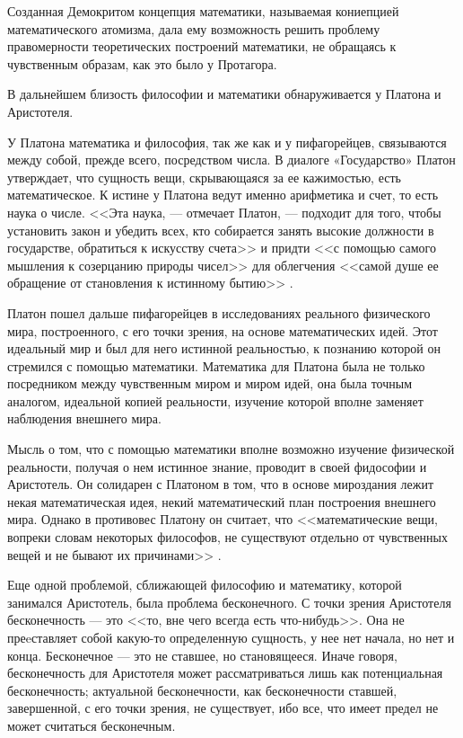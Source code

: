 \documentclass[a4page]{article}
\begin{document}
Созданная Демокритом концепция математики, называемая кониепцией математического атомизма,
дала ему возможность решить проблему правомерности теоретических построений математики,
не обращаясь к чувственным образам, как это было у Протагора.

В дальнейшем близость философии и математики обнаруживается у Платона и Аристотеля.

У Платона математика и философия, так же как и у пифагорейцев,
связываются между собой, прежде всего, посредством числа.
В диалоге «Государство» Платон утверждает, что сущность вещи,
скрывающаяся за ее кажимостью, есть математическое.
К истине у Платона ведут именно арифметика и счет, то есть наука о числе.
<<Эта наука, --- отмечает Платон, --- подходит для того,
чтобы установить закон и убедить всех,
кто собирается занять высокие должности в государстве, обратиться к искусству счета>>
и придти <<с помощью самого мышления к созерцанию природы чисел>>
для облегчения <<самой душе ее обращение от становления к истинному бытию>> \cite{plato-compilation}.

Платон пошел дальше пифагорейцев в исследованиях реального физического мира,
построенного, с его точки зрения, на основе математических идей.
Этот идеальный мир и был для него истинной реальностью,
к познанию которой он стремился с помощью математики.
Математика для Платона была не только посредником между чувственным миром и миром идей,
она была точным аналогом, идеальной копией реальности,
изучение которой вполне заменяет наблюдения внешнего мира.

Мысль о том, что с помощью математики вполне возможно изучение физической реальности,
получая о нем истинное знание, проводит в своей фидософии и Аристотель.
Он солидарен с Платоном в том, что в основе мироздания лежит некая математическая идея,
некий математический план построения внешнего мира.
Однако в противовес Платону он считает,
что <<математические вещи, вопреки словам некоторых философов,
не существуют отдельно от чувственных вещей и не бывают их причинами>> \cite{aristotle-metaphysics}.

Еще одной проблемой, сближающей философию и математику, которой занимался Аристотель,
была проблема бесконечного.
С точки зрения Аристотеля бесконечность --- это <<то, вне чего всегда есть что-нибудь>>.
Она не преeставляет собой какую-то определенную сущность, у нее нет начала, но нет и конца.
Бесконечное --- это не ставшее, но становящееся.
Иначе говоря, бесконечность для Аристотеля может рассматриваться лишь как потенциальная бесконечность;
актуальной бесконечности, как бесконечности ставшей, завершенной,
с его точки зрения, не существует, ибо все, что имеет предел не может считаться бесконечным.
\end{document}
